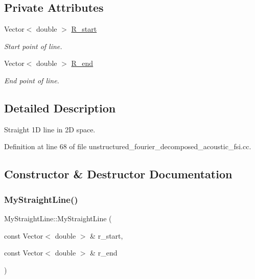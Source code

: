 \subsection*{Private Attributes}
\begin{DoxyCompactItemize}
\item 
Vector$<$ double $>$ \hyperlink{classMyStraightLine_a0f66636dd5d1e7ff6ec93acf90879f0c}{R\+\_\+start}
\begin{DoxyCompactList}\small\item\em Start point of line. \end{DoxyCompactList}\item 
Vector$<$ double $>$ \hyperlink{classMyStraightLine_afa466e12301ccea99a02fe1bde615691}{R\+\_\+end}
\begin{DoxyCompactList}\small\item\em End point of line. \end{DoxyCompactList}\end{DoxyCompactItemize}


\subsection{Detailed Description}
Straight 1D line in 2D space. 

Definition at line 68 of file unstructured\+\_\+fourier\+\_\+decomposed\+\_\+acoustic\+\_\+fsi.\+cc.



\subsection{Constructor \& Destructor Documentation}
\mbox{\label{classMyStraightLine_a2c63e574f21703250a31fc446ab8045d}} 
\subsubsection{\texorpdfstring{My\+Straight\+Line()}{MyStraightLine()}\hspace{0.1cm}{\footnotesize\ttfamily [1/2]}}
{\footnotesize\ttfamily My\+Straight\+Line\+::\+My\+Straight\+Line (\begin{DoxyParamCaption}\item[{const Vector$<$ double $>$ \&}]{r\+\_\+start,  }\item[{const Vector$<$ double $>$ \&}]{r\+\_\+end }\end{DoxyParamCaption})\hspace{0.3cm}{\ttfamily [inline]}}



